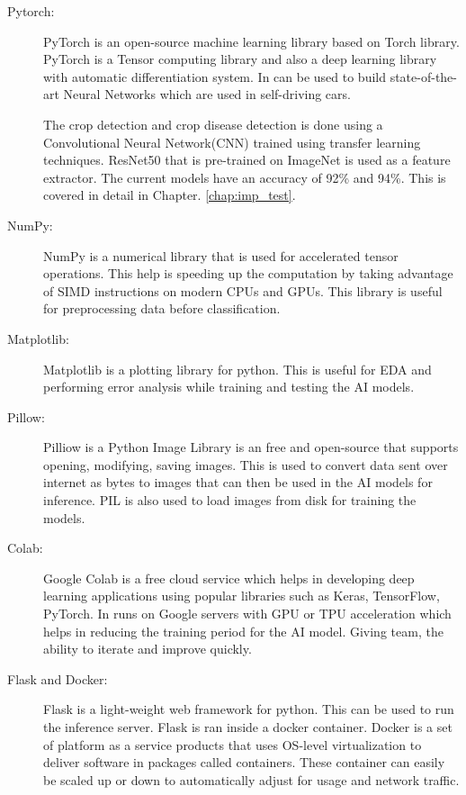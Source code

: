 \documentclass[../Report.tex]{subfiles}
\begin{document}
\begin{description}
  \item[Pytorch:] PyTorch\cite{pytorch} is an open-source machine learning library based on Torch library. PyTorch is a Tensor computing library and also 
  a deep learning library with automatic differentiation system. In can be used to build state-of-the-art Neural Networks which are used in
  self-driving cars.\par
  The crop detection and crop disease detection is done using a Convolutional Neural Network(CNN)\cite{cnn} trained using transfer learning 
  techniques. ResNet50\cite{resnet} that is pre-trained on ImageNet\cite{imagenet} is used as a feature extractor.
  The current models have an accuracy of 92\% and 94\%.  This is covered in detail in Chapter. \ref{chap:imp_test}.

  \item[NumPy:] NumPy\cite{numpy} is a numerical library that is used for accelerated tensor operations. This help is speeding up the computation by 
  taking advantage of SIMD instructions on modern CPUs and GPUs. This library is useful for preprocessing data before classification.

  \item[Matplotlib:] Matplotlib\cite{pyplot} is a plotting library for python. This is useful for EDA and performing error analysis while training 
  and testing the AI models.

  \item[Pillow:] Pilliow\cite{pillow} is a Python Image Library is an free and open-source that supports opening, modifying, saving images. This is 
  used to convert data sent over internet as bytes to images that can then be used in the AI models for inference. PIL is also used to load 
  images from disk for training the models.

  \item[Colab:] Google Colab\cite{colab} is a free cloud service which helps in developing deep learning applications using popular libraries such 
  as Keras, TensorFlow, PyTorch. In runs on Google servers with GPU or TPU acceleration which helps in reducing the training period for 
  the AI model. Giving team, the ability to iterate and improve quickly.

  \item[Flask and Docker:] Flask\cite{flask} is a light-weight web framework for python. This can be used to run the inference server. Flask is ran
  inside a docker container. Docker is a set of platform as a service products that uses OS-level virtualization to deliver software in 
  packages called containers. These container can easily be scaled up or down to automatically adjust for usage and network traffic.


\end{description}
\end{document}
